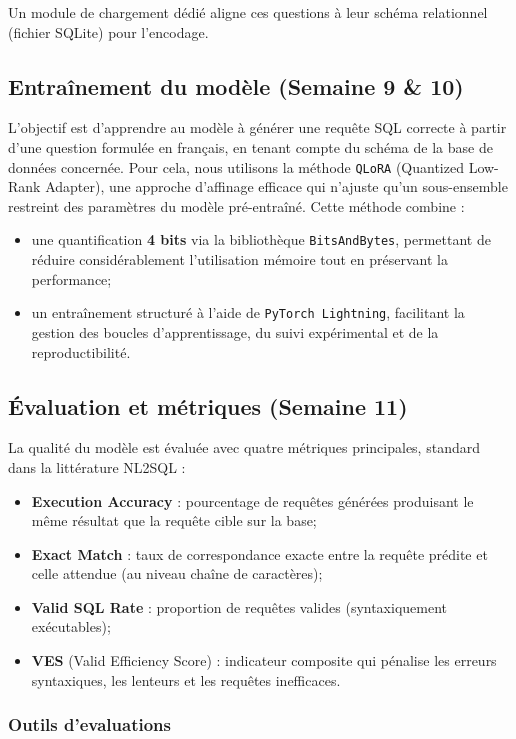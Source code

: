 \documentclass[12pt]{article}
\begin{document}
Un module de chargement dédié aligne ces questions à leur schéma relationnel (fichier SQLite) pour l'encodage.

\subsection{Entraînement du modèle (Semaine 9 \& 10)}
L’objectif est d’apprendre au modèle à générer une requête SQL correcte à partir d’une question formulée en français, en tenant compte du schéma de la base de données concernée. Pour cela, nous utilisons la méthode \texttt{QLoRA} (Quantized Low-Rank Adapter), une approche d’affinage efficace qui n’ajuste qu’un sous-ensemble restreint des paramètres du modèle pré-entraîné. Cette méthode combine :
\begin{itemize}
  \item une quantification \textbf{4 bits} via la bibliothèque \texttt{BitsAndBytes}, permettant de réduire considérablement l’utilisation mémoire tout en préservant la performance;
  \item un entraînement structuré à l’aide de \texttt{PyTorch Lightning}, facilitant la gestion des boucles d’apprentissage, du suivi expérimental et de la reproductibilité.
\end{itemize}


\subsection{Évaluation et métriques (Semaine 11)}
La qualité du modèle est évaluée avec quatre métriques principales, standard dans la littérature NL2SQL :
\begin{itemize}
  \item \textbf{Execution Accuracy} : pourcentage de requêtes générées produisant le même résultat que la requête cible sur la base;
  \item \textbf{Exact Match} : taux de correspondance exacte entre la requête prédite et celle attendue (au niveau chaîne de caractères);
  \item \textbf{Valid SQL Rate} : proportion de requêtes valides (syntaxiquement exécutables);
  \item \textbf{VES} (Valid Efficiency Score) : indicateur composite qui pénalise les erreurs syntaxiques, les lenteurs et les requêtes inefficaces.
\end{itemize}

\subsubsection{Outils d'evaluations}
\end{document}
